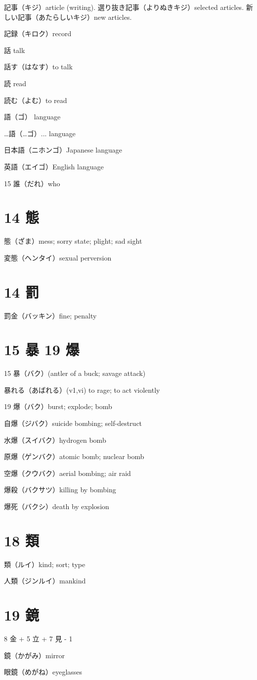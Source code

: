 記事（キジ）article (writing).
選り抜き記事（よりぬきキジ）selected articles.
新しい記事（あたらしいキジ）new articles.

記録（キロク）record

話 talk

話す（はなす）to talk

読 read

読む（よむ）to read

語（ゴ） language

…語（…ゴ）... language

日本語（ニホンゴ）Japanese language

英語（エイゴ）English language

15 誰（だれ）who

\section{14 態}

態（ざま）mess; sorry state; plight; sad sight

変態（ヘンタイ）sexual perversion

\section{14 罰}

罰金（バッキン）fine; penalty

\section{15 暴 19 爆}

15 暴（バク）(antler of a buck; savage attack)

暴れる（あばれる）(v1,vi) to rage; to act violently

19 爆（バク）burst; explode; bomb

自爆（ジバク）suicide bombing; self-destruct

水爆（スイバク）hydrogen bomb

原爆（ゲンバク）atomic bomb; nuclear bomb

空爆（クウバク）aerial bombing; air raid

爆殺（バクサツ）killing by bombing

爆死（バクシ）death by explosion

\section{18 類}

類（ルイ）kind; sort; type

人類（ジンルイ）mankind

\section{19 鏡}

8 金 + 5 立 + 7 見 - 1

鏡（かがみ）mirror

眼鏡（めがね）eyeglasses
